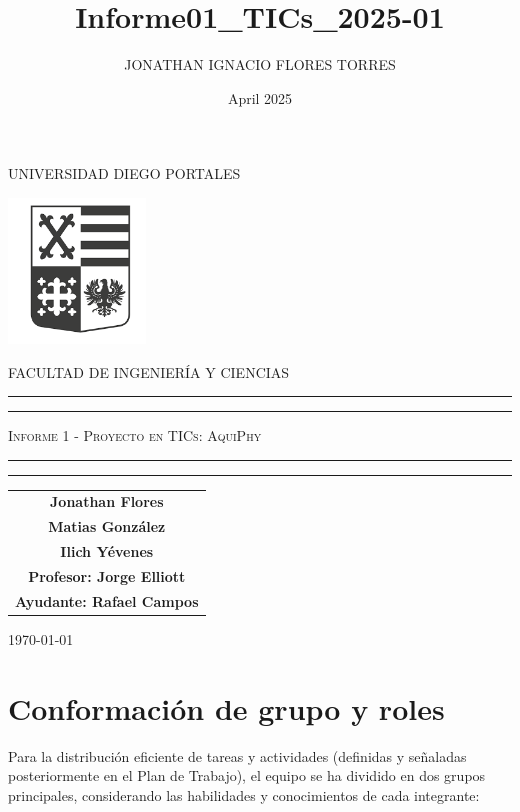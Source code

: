 \documentclass{article}
\title{Informe01_TICs_2025-01}
\author{JONATHAN IGNACIO FLORES TORRES}
\date{April 2025}
\begin{document}
\begin{titlepage}
\centering
\vspace{1cm}
{\Large UNIVERSIDAD DIEGO PORTALES \par}
\vspace{0.5cm}
{\includegraphics[scale=0.5]{images/logo.png}\par}
\vspace{0.5cm}
{\scshape\Large FACULTAD DE INGENIERÍA Y CIENCIAS \par}

\vspace{3cm}
\centering
    \vspace*{1cm}
   \hrule height 0.5pt
\vspace{1mm}
\hrule height 1.5pt
\vspace{1cm}
{\scshape\Huge Informe 1 - Proyecto en TICs: AquiPhy \par}
\vspace{1cm}
\hrule height 1.5pt
\vspace{1mm}
\hrule height 0.5pt
\vspace{1.5cm}

\begin{tabular}{c}
    \textbf{Jonathan Flores} \\
        \textbf{Matias González} \\
    \textbf{Ilich Yévenes} \\
    \textbf{Profesor: Jorge Elliott} \\
    \textbf{Ayudante: Rafael Campos} \\
\end{tabular}

\vfill \today
\vspace*{1cm}
\end{titlepage}

\tableofcontents
\newpage
\section{Conformación de grupo y roles}

Para la distribución eficiente de tareas y actividades (definidas y señaladas posteriormente en el Plan de Trabajo), el equipo se ha dividido en dos grupos principales, considerando las habilidades y conocimientos de cada integrante:
\end{document}

